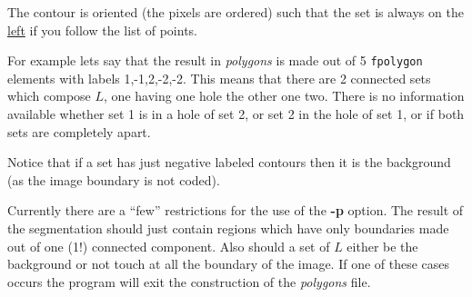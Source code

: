 The contour is oriented (the pixels are ordered)
 such that the set is always on the \underline{left}
 if you follow the list of points.

For example lets say that the result in {\em polygons} is made
out of  5 {\tt fpolygon} elements with labels 1,-1,2,-2,-2. This 
means that there are 2 connected sets which compose $L$, one having
one hole the other one two. There is no information available
whether  set 1 is in a hole of set 2, or set 2 in the hole of set 1, or if
both sets are completely apart. 

Notice that if a set has just negative
labeled contours then it is the background (as the image boundary is
not coded).

Currently there are a ``few'' restrictions for the use of the {\bf -p} option.
The result of the segmentation should just contain regions which
have only boundaries made out of one (1!) connected component. Also
should a set of $L$ either be the background or not touch at all the
boundary of the image. If one of these cases occurs the program will exit
the construction of the {\em polygons} file.